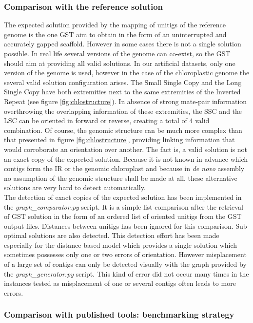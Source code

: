 \documentclass[12pt]{article}
\begin{document}
\subsubsection{Comparison with the reference solution}
The expected solution provided by the mapping of unitigs of the reference genome is the one GST aim to obtain in the form of an uninterrupted and accurately gapped scaffold. However in some cases there is not a single solution possible. In real life several versions of the genome can co-exist, so the GST should aim at providing all valid solutions. In our artificial datasets, only one version of the genome is used, however in the case of the chloroplastic genome the several valid solution configuration arises. The Small Single Copy and the Long Single Copy have both extremities next to the same extremities of the Inverted Repeat (see figure \ref{fig:chlostructure}). In absence of strong mate-pair information overthrowing the overlapping information of these extremities, the SSC and the LSC can be oriented in forward or reverse, creating a total of 4 valid combination. Of course, the genomic structure can be much more complex than that presented in figure \ref{fig:chlostructure}, providing linking information that would corroborate an orientation over another. The fact is, a valid solution is not an exact copy of the expected solution. Because it is not known in advance which contigs form the IR or the genomic chloroplast and because in \textit{de novo} assembly no assumption of the genomic structure shall be made at all, these alternative solutions are very hard to detect automatically. \\
The detection of exact copies of the expected solution has been implemented in the \textit{graph\_comparator.py} script. It is a simple list comparison after the retrieval of GST solution in the form of an ordered list of oriented unitigs from the GST output files. Distances between unitigs has been ignored for this comparison. Sub-optimal solutions are also detected. This detection effort has been made especially for the distance based model which provides a single solution which sometimes possesses only one or two errors of orientation. However misplacement of a large set of contigs can only be detected visually with the graph provided by the \textit{graph\_generator.py} script. This kind of error did not occur many times in the instances tested as misplacement of one or several contigs often leads to more errors.

\subsubsection{Comparison with published tools: benchmarking strategy}
\end{document}
